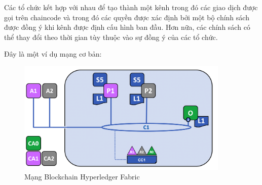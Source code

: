 Các tổ chức kết hợp với nhau để tạo thành một kênh trong đó các giao dịch được gọi 
trên chaincode và trong đó các quyền được xác định bởi một bộ chính sách được đồng ý 
khi kênh được định cấu hình ban đầu. Hơn nữa, các chính sách có thể thay đổi theo 
thời gian tùy thuộc vào sự đồng ý của các tổ chức.

Đây là một ví dụ mạng cơ bản: 

\begin{figure}[h]
    \centering
    \includegraphics[width=0.9\textwidth]{images/network.png}
    \caption{Mạng Blockchain Hyperledger Fabric }
\end{figure}

